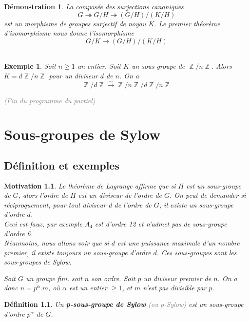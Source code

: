 \documentclass[a4paper, oneside]{report}
\theoremstyle{break}
\newtheorem{definition}[thm]{Définition}
\newtheorem{exemple}[thm]{Exemple}
\newtheorem*{motivation}{Motivation}
\newtheorem*{demo}{Démonstration}
\newcommand{\mdg}{morphisme de groupes }
\newcommand{\isom}{isomorphisme }
\newcommand{\gray}[1]{\textcolor{gray}{#1}}
\newcommand{\fong}{\overset{\sim}{\rightarrow}}
\newcommand{\surj}{\twoheadrightarrow}
\DeclareMathOperator{\Z}{\mathbb{Z}}
\newcommand{\slign}{\textbf}
\begin{document}
\begin{demo}
La composée des surjections canoniques 
$$G\surj G/H \surj (G/H)\big/(K/H)$$
est un \mdg surjectif de noyau $K$. Le premier théorème d'\isom nous donne l'\isom 
$$G/K \rightarrow (G/H)\big/(K/H)$$
~
\end{demo}

\begin{exemple}
Soit $n \geq 1$ un entier. Soit $K$ un sous-groupe de $\Z/n\Z$. Alors $K = d \Z/n\Z$ pour un diviseur $d$ de $n$. On a
\[
\Z/d\Z \fong \Z/n\Z \big/ d\Z/n\Z
\]

\gray{(Fin du programme du partiel)}
\end{exemple}

\chapter{Sous-groupes de Sylow}

\section{Définition et exemples}

\begin{motivation}
Le théorème de Lagrange affirme que si $H$ est un sous-groupe de $G$, alors l'ordre de $H$ est un diviseur de l'ordre de $G$. On peut de demander si réciproquement, pour tout diviseur d de l'ordre de $G$, il existe un sous-groupe d'ordre $d$.\\
Ceci est faux, par exemple $A_4$ est d'ordre 12 et n'admet pas de sous-groupe d'ordre 6.\\
Néanmoins, nous allons voir que si $d$ est une puissance maximale d'un nombre premier, il existe toujours un sous-groupe d'ordre $d$. Ces sous-groupes sont les sous-groupes de Sylow.

\vspace{1em}
\medbreak

Soit $G$ un groupe fini. soit $n$ son ordre. Soit $p$ un diviseur premier de $n$. On a donc $n = p^\alpha . m$, où $\alpha$ est un entier $\geq 1$, et $m$ n'est pas divisible par $p$.
\end{motivation}

\begin{definition}
Un \slign{p-sous-groupe de Sylow} \gray{(ou $p$-Sylow)} est un sous-groupe d'ordre $p^\alpha$ de $G$.
\end{definition}
\end{document}

